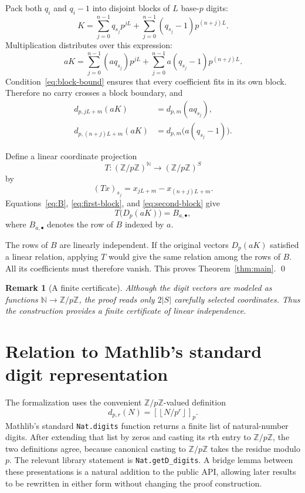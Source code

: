 \documentclass[11pt]{article}
\newtheorem{remark}{Remark}
\newcommand{\N}{\mathbb{N}}
\newcommand{\Z}{\mathbb{Z}}
\newcommand{\Zmod}[1]{\Z/#1\Z}
\newcommand{\digit}{d}
\newcommand{\digits}{D}
\begin{document}
Pack both $q_i$ and $q_i-1$ into disjoint blocks of $L$ base-$p$ digits:
\begin{equation}
  K
  =
  \sum_{j=0}^{n-1}q_{s_j}p^{jL}
  +
  \sum_{j=0}^{n-1}(q_{s_j}-1)p^{(n+j)L}.
  \label{eq:K}
\end{equation}
Multiplication distributes over this expression:
\[
  aK
  =
  \sum_{j=0}^{n-1}(aq_{s_j})p^{jL}
  +
  \sum_{j=0}^{n-1}a(q_{s_j}-1)p^{(n+j)L}.
\]
Condition~\eqref{eq:block-bound} ensures that every coefficient fits in its
own block. Therefore no carry crosses a block boundary, and
\begin{align}
  \digit_{p,jL+m}(aK)
    &=\digit_{p,m}(aq_{s_j}),
    \label{eq:first-block}\\
  \digit_{p,(n+j)L+m}(aK)
    &=\digit_{p,m}\bigl(a(q_{s_j}-1)\bigr).
    \label{eq:second-block}
\end{align}

Define a linear coordinate projection
\begin{equation}
  T:(\Zmod p)^{\N}\longrightarrow(\Zmod p)^S
\end{equation}
by
\begin{equation}
  (Tx)_{s_j}
  =x_{jL+m}-x_{(n+j)L+m}.
  \label{eq:T}
\end{equation}
Equations~\eqref{eq:B}, \eqref{eq:first-block}, and
\eqref{eq:second-block} give
\begin{equation}
  T\bigl(\digits_p(aK)\bigr)=B_{a,\bullet},
  \label{eq:T-row}
\end{equation}
where $B_{a,\bullet}$ denotes the row of $B$ indexed by $a$.

The rows of $B$ are linearly independent. If the original vectors
$\digits_p(aK)$ satisfied a linear relation, applying $T$ would give the same
relation among the rows of $B$. All its coefficients must therefore vanish.
This proves Theorem~\ref{thm:main}.
\qed

\begin{remark}[A finite certificate]
Although the digit vectors are modeled as functions
$\N\to\Zmod p$, the proof reads only $2|S|$ carefully selected coordinates.
Thus the construction provides a finite certificate of linear independence.
\end{remark}

\section{Relation to Mathlib's standard digit representation}

The formalization uses the convenient $\Zmod p$-valued definition
\[
  \digit_{p,r}(N)
  =\left[\left\lfloor N/p^r\right\rfloor\right]_p.
\]
Mathlib's standard \texttt{Nat.digits} function returns a finite list of
natural-number digits. After extending that list by zeros and casting its
$r$th entry to $\Zmod p$, the two definitions agree, because canonical casting
to $\Zmod p$ takes the residue modulo $p$. The relevant library statement is
\texttt{Nat.getD\_digits}. A bridge lemma between these presentations is a
natural addition to the public API, allowing later results to be rewritten in
either form without changing the proof construction.
\end{document}
